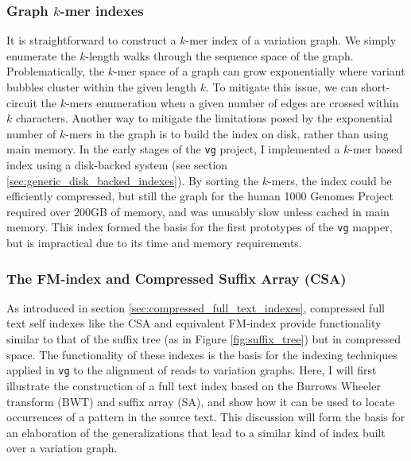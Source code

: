 \subsubsection{Graph $k$-mer indexes}

It is straightforward to construct a $k$-mer index of a variation graph.
We simply enumerate the $k$-length walks through the sequence space of the graph.
Problematically, the $k$-mer space of a graph can grow exponentially where variant bubbles cluster within the given length $k$.
To mitigate this issue, we can short-circuit the $k$-mers enumeration when a given number of edges are crossed within $k$ characters.
Another way to mitigate the limitations posed by the exponential number of $k$-mers in the graph is to build the index on disk, rather than using main memory.
In the early stages of the {\tt vg} project, I implemented a $k$-mer based index using a disk-backed system (see section \ref{sec:generic_disk_backed_indexes}).
By sorting the $k$-mers, the index could be efficiently compressed, but still the graph for the human 1000 Genomes Project required over 200GB of memory, and was unusably slow unless cached in main memory.
This index formed the basis for the first prototypes of the {\tt vg} mapper, but is impractical due to its time and memory requirements.

\subsubsection{The FM-index and Compressed Suffix Array (CSA)}
\label{sec:fmidx_csa}

As introduced in section \ref{sec:compressed_full_text_indexes}, compressed full text self indexes like the CSA and equivalent FM-index provide functionality similar to that of the suffix tree (as in Figure \ref{fig:suffix_tree}) but in compressed space.
The functionality of these indexes is the basis for the indexing techniques applied in {\tt vg} to the alignment of reads to variation graphs.
Here, I will first illustrate the construction of a full text index based on the Burrows Wheeler transform (BWT) and suffix array (SA), and show how it can be used to locate occurrences of a pattern in the source text.
This discussion will form the basis for an elaboration of the generalizations that lead to a similar kind of index built over a variation graph.

